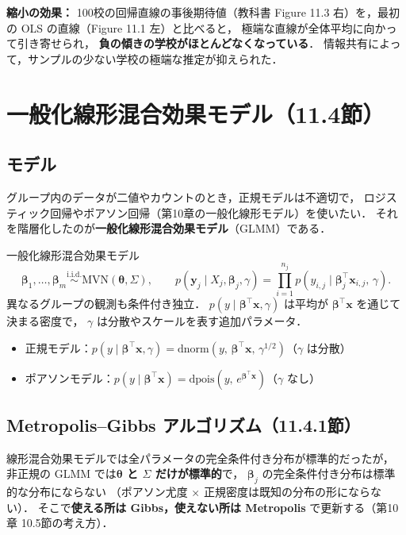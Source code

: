 \documentclass[lualatex,ja=standard,a4paper,12pt]{bxjsarticle}
\newcommand{\mvn}{\mathrm{MVN}}
\begin{document}
\begin{pointbox}
\textbf{縮小の効果：}
100校の回帰直線の事後期待値（教科書 Figure 11.3 右）を，最初の OLS の直線（Figure 11.1 左）と比べると，
極端な直線が全体平均に向かって引き寄せられ，
\textbf{負の傾きの学校がほとんどなくなっている}．
情報共有によって，サンプルの少ない学校の極端な推定が抑えられた．
\end{pointbox}

\section{一般化線形混合効果モデル（11.4節）}

\subsection{モデル}

グループ内のデータが二値やカウントのとき，正規モデルは不適切で，
ロジスティック回帰やポアソン回帰（第10章の一般化線形モデル）を使いたい．
それを階層化したのが\textbf{一般化線形混合効果モデル}（GLMM）である．

\begin{defbox}{一般化線形混合効果モデル}
\[
  \bm{\beta}_1, \ldots, \bm{\beta}_m \overset{\text{i.i.d.}}{\sim} \mvn(\bm{\theta}, \Sigma),
  \qquad
  p(\bm{y}_j \mid X_j, \bm{\beta}_j, \gamma) = \prod_{i=1}^{n_j} p(y_{i,j} \mid \bm{\beta}_j^\top \bm{x}_{i,j},\, \gamma).
\]
異なるグループの観測も条件付き独立．
$p(y \mid \bm{\beta}^\top\bm{x}, \gamma)$ は平均が $\bm{\beta}^\top\bm{x}$ を通じて決まる密度で，
$\gamma$ は分散やスケールを表す追加パラメータ．
\begin{itemize}
  \item 正規モデル：$p(y \mid \bm{\beta}^\top\bm{x}, \gamma) = \mathrm{dnorm}(y,\, \bm{\beta}^\top\bm{x},\, \gamma^{1/2})$（$\gamma$ は分散）
  \item ポアソンモデル：$p(y \mid \bm{\beta}^\top\bm{x}) = \mathrm{dpois}(y,\, e^{\bm{\beta}^\top\bm{x}})$（$\gamma$ なし）
\end{itemize}
\end{defbox}

\subsection{Metropolis--Gibbs アルゴリズム（11.4.1節）}

線形混合効果モデルでは全パラメータの完全条件付き分布が標準的だったが，
非正規の GLMM では\textbf{$\bm{\theta}$ と $\Sigma$ だけが標準的}で，
$\bm{\beta}_j$ の完全条件付き分布は標準的な分布にならない
（ポアソン尤度 × 正規密度は既知の分布の形にならない）．
そこで\textbf{使える所は Gibbs，使えない所は Metropolis} で更新する（第10章 10.5節の考え方）．
\end{document}
